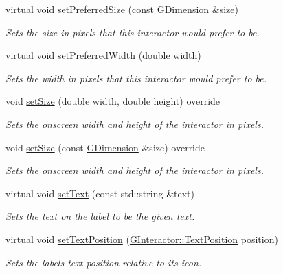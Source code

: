 \begin{DoxyCompactItemize}
virtual void \mbox{\hyperlink{classsgl_1_1GInteractor_aa22d9be4bc0e078bb0ea69b0fc9d7c75}{set\+Preferred\+Size}} (const \mbox{\hyperlink{structsgl_1_1GDimension}{G\+Dimension}} \&size)
\begin{DoxyCompactList}\small\item\em Sets the size in pixels that this interactor would prefer to be. \end{DoxyCompactList}\item 
virtual void \mbox{\hyperlink{classsgl_1_1GInteractor_a3db429ab2fa52efd187eec0ed8cdd9f2}{set\+Preferred\+Width}} (double width)
\begin{DoxyCompactList}\small\item\em Sets the width in pixels that this interactor would prefer to be. \end{DoxyCompactList}\item 
void \mbox{\hyperlink{classsgl_1_1GLabel_a8ba9af72c23f52d4b93096a13a11f150}{set\+Size}} (double width, double height) override
\begin{DoxyCompactList}\small\item\em Sets the onscreen width and height of the interactor in pixels. \end{DoxyCompactList}\item 
void \mbox{\hyperlink{classsgl_1_1GLabel_a42d96e60c62d7770993327d7147d77b8}{set\+Size}} (const \mbox{\hyperlink{structsgl_1_1GDimension}{G\+Dimension}} \&size) override
\begin{DoxyCompactList}\small\item\em Sets the onscreen width and height of the interactor in pixels. \end{DoxyCompactList}\item 
virtual void \mbox{\hyperlink{classsgl_1_1GLabel_ac1ae51949d41ee9054634be5967d91b8}{set\+Text}} (const std\+::string \&text)
\begin{DoxyCompactList}\small\item\em Sets the text on the label to be the given text. \end{DoxyCompactList}\item 
virtual void \mbox{\hyperlink{classsgl_1_1GLabel_af822b8d73c652f7c59d875d7cdfc5302}{set\+Text\+Position}} (\mbox{\hyperlink{classsgl_1_1GInteractor_a8e0d441725a81d2bbdebbea09078260e}{G\+Interactor\+::\+Text\+Position}} position)
\begin{DoxyCompactList}\small\item\em Sets the label\textquotesingle{}s text position relative to its icon. \end{DoxyCompactList}\item 

\end{DoxyCompactItemize}
